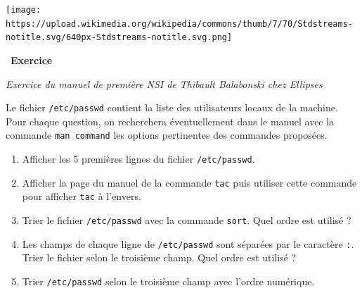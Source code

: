 \documentclass[
  11pt,
]{article}
\providecommand{\tightlist}{%
  \setlength{\itemsep}{0pt}\setlength{\parskip}{0pt}}
\newcounter{exo}
\newenvironment{exercice}[1]
{\par \medskip   \addtocounter{exo}{1} \noindent  
\begin{bclogo}[arrondi =0.1,   noborder = true, logo=\bccrayon, marge=4]{~\textbf{Exercice} \textbf{\theexo} {\itshape #1} }  \par}
{
\end{bclogo}
 \par \bigskip }
\newcounter{prop}
\newcounter{def}
\begin{document}
\texttt{[image: https://upload.wikimedia.org/wikipedia/commons/thumb/7/70/Stdstreams-notitle.svg/640px-Stdstreams-notitle.svg.png]}\\

\begin{exercice}{}

\emph{Exercice du manuel de première NSI de Thibault Balabonski chez
Ellipses}

Le fichier \texttt{/etc/passwd} contient la liste des utilisateurs
locaux de la machine. Pour chaque question, on recherchera
éventuellement dans le manuel avec la commande \texttt{man\ command} les
options pertinentes des commandes proposées.

\begin{enumerate}
\def\labelenumi{\arabic{enumi}.}
\tightlist
\item
  Afficher les 5 premières lignes du fichier \texttt{/etc/passwd}.
\item
  Afficher la page du manuel de la commande \texttt{tac} puis utiliser
  cette commande pour afficher \texttt{tac} à l'envers.
\item
  Trier le fichier \texttt{/etc/passwd} avec la commande \texttt{sort}.
  Quel ordre est utilisé ?
\item
  Les champs de chaque ligne de \texttt{/etc/passwd} sont séparées par
  le caractère \texttt{:}. Trier le fichier selon le troisième champ.
  Quel ordre est utilisé ?
\item
  Trier \texttt{/etc/passwd} selon le troisième champ avec l'ordre
  numérique.
\end{enumerate}

\end{exercice}
\end{document}
